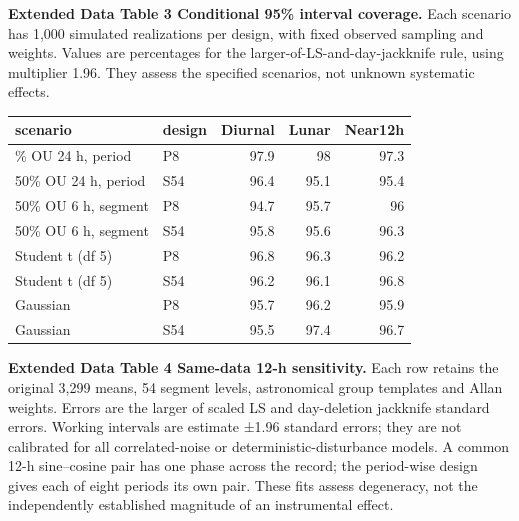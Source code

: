 \documentclass[
  12pt,
  a4paper,
]{article}
\begin{document}
\clearpage

\textbf{Extended Data Table 3 \textbar{} Conditional 95\% interval
coverage.} Each scenario has 1,000 simulated realizations per design,
with fixed observed sampling and weights. Values are percentages for the
larger-of-LS-and-day-jackknife rule, using multiplier 1.96. They assess
the specified scenarios, not unknown systematic effects.

\begin{longtable}[]{@{}llrrr@{}}
\toprule\noalign{}
scenario & design & Diurnal & Lunar & Near12h \\
\midrule\noalign{}
\endhead
\bottomrule\noalign{}
\endlastfoot
50\% OU 24 h, period & P8 & 97.9 & 98 & 97.3 \\
50\% OU 24 h, period & S54 & 96.4 & 95.1 & 95.4 \\
50\% OU 6 h, segment & P8 & 94.7 & 95.7 & 96 \\
50\% OU 6 h, segment & S54 & 95.8 & 95.6 & 96.3 \\
Student t (df 5) & P8 & 96.8 & 96.3 & 96.2 \\
Student t (df 5) & S54 & 96.2 & 96.1 & 96.8 \\
Gaussian & P8 & 95.7 & 96.2 & 95.9 \\
Gaussian & S54 & 95.5 & 97.4 & 96.7 \\
\end{longtable}

\clearpage

\textbf{Extended Data Table 4 \textbar{} Same-data 12-h sensitivity.}
Each row retains the original 3,299 means, 54 segment levels,
astronomical group templates and Allan weights. Errors are the larger of
scaled LS and day-deletion jackknife standard errors. Working intervals
are estimate ±1.96 standard errors; they are not calibrated for all
correlated-noise or deterministic-disturbance models. A common 12-h
sine--cosine pair has one phase across the record; the period-wise
design gives each of eight periods its own pair. These fits assess
degeneracy, not the independently established magnitude of an
instrumental effect.
\end{document}
